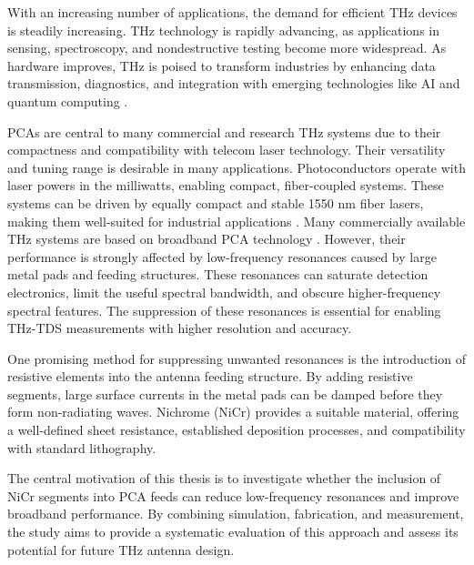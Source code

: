 With an increasing number of applications, the demand for efficient THz devices is steadily increasing. THz technology is rapidly advancing, as applications in sensing, spectroscopy, and nondestructive testing become more widespread. As hardware improves, THz is poised to transform industries by enhancing data transmission, diagnostics, and integration with emerging technologies like AI and quantum computing \cite{shekariApplicationsTerahertzTechnology2025}. 

PCAs are central to many commercial and research THz systems due to their compactness and compatibility with telecom laser technology. Their versatility and tuning range is desirable in many applications. Photoconductors operate with laser powers in the milliwatts, enabling compact, fiber-coupled systems. These systems can be driven by equally compact and stable \num{1550} \si{\nano \meter} fiber lasers, making them well-suited for industrial applications \cite{naftalyIndustrialApplicationsTerahertz2019}. Many commercially available THz systems are based on broadband PCA technology \cite{burfordReviewTerahertzPhotoconductive2017}. However, their performance is strongly affected by low-frequency resonances caused by large metal pads and feeding structures. These resonances can saturate detection electronics, limit the useful spectral bandwidth, and obscure higher-frequency spectral features. The suppression of these resonances is essential for enabling THz-TDS measurements with higher resolution and accuracy.

One promising method for suppressing unwanted resonances is the introduction of resistive elements into the antenna feeding structure. By adding resistive segments, large surface currents in the metal pads can be damped before they form non-radiating waves. Nichrome (NiCr) provides a suitable material, offering a  well-defined sheet resistance, established deposition processes, and compatibility with standard lithography.

The central motivation of this thesis is to investigate whether the inclusion of NiCr segments into PCA feeds can reduce low-frequency resonances and improve broadband performance. By combining simulation, fabrication, and measurement, the study aims to provide a systematic evaluation of this approach and assess its potential for future THz antenna design.









